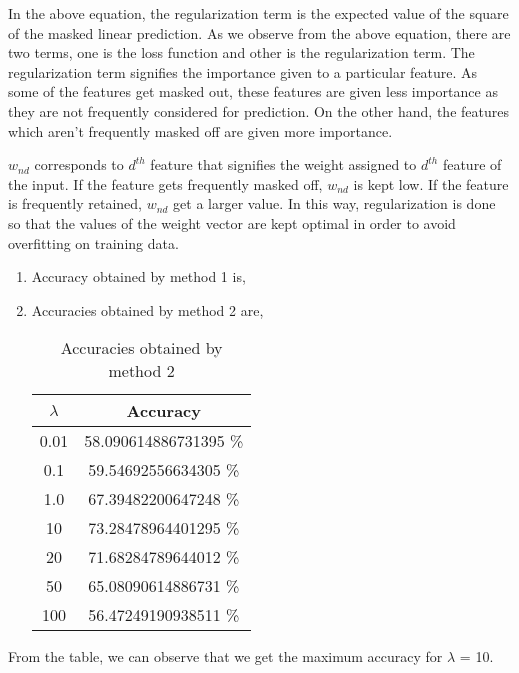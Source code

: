 \documentclass[a4paper,11pt]{article}
\begin{document}
\begin{mlsolution}
\begin{itemize}
	\end{itemize}
	In the above equation, the regularization term is the expected value of the square of the masked linear prediction. As we observe from the above equation, there are two terms, one is the loss function and other is the regularization term. The regularization term signifies the importance given to a particular feature. As some of the features get masked out, these features are given less importance as they are not frequently considered for prediction. On the other hand, the features which aren't frequently masked off are given more importance.
	
	$w_{nd}$ corresponds to $d^{th}$ feature that signifies the weight assigned to $d^{th}$ feature of the input. If the feature gets frequently masked off, $w_{nd}$ is kept low. If the feature is frequently retained, $w_{nd}$ get a larger value. In this way, regularization is done so that the values of the weight vector are kept optimal in order to avoid overfitting on training data.


\end{mlsolution}

\begin{mlsolution}
	\begin{enumerate}
		\item Accuracy obtained by method 1 is,
		\begin{center}
		\end{center}
		
		\item Accuracies obtained by method 2 are,
		\begin{table}[ht]
			\centering
			\begin{tabular}{|c|c|}
				\hline
				$\lambda$ & Accuracy \\
				\hline
				0.01 & 58.090614886731395 \% \\
				0.1 & 59.54692556634305 \% \\
				1.0 & 67.39482200647248 \% \\
				10 & 73.28478964401295 \% \\
				20 & 71.68284789644012 \% \\
				50 & 65.08090614886731 \% \\
				100 & 56.47249190938511 \% \\
				\hline
			\end{tabular}
			\caption{Accuracies obtained by method 2}
		\end{table}
	\end{enumerate}
	From the table, we can observe that we get the maximum accuracy for $\lambda$ = 10.

\end{mlsolution}
\end{document}
